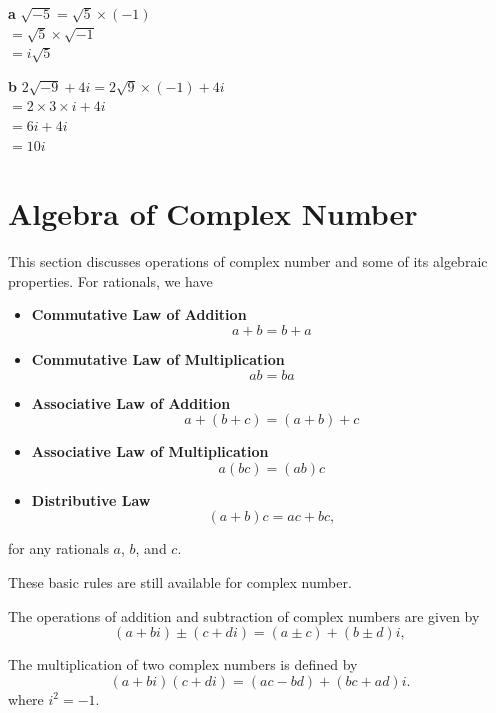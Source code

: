 \documentclass[
	12pt, %
	fleqn, %
	a4paper, %
]{LegrandOrangeBook}
\begin{document}
\textbf{a} \(\sqrt{-5} = \sqrt{5} \times (-1)\) \\
 \(= \sqrt{5} \times \sqrt{-1}\) \\
 \(= i\sqrt{5}\)

\textbf{b} \(2\sqrt{-9} + 4i = 2\sqrt{9} \times (-1) + 4i\) \\
 \(= 2 \times 3 \times i + 4i\) \\
 \(= 6i + 4i\) \\
 \(= 10i\)
\section{Algebra of Complex Number} 
This section discusses operations of complex number and some of its algebraic properties.
For rationals, we have \begin{itemize}
    \item \textbf{Commutative Law of Addition}
    \[ a + b = b + a \]
    
    \item \textbf{Commutative Law of Multiplication}
    \[ ab = ba \]
    
    \item \textbf{Associative Law of Addition}
    \[ a + (b + c) = (a + b) + c \]
    
    \item \textbf{Associative Law of Multiplication}
    \[ a(bc) = (ab)c \]
    
    \item \textbf{Distributive Law}
    \[ (a + b)c = ac + bc, \]
\end{itemize}

for any rationals \( a \), \( b \), and \( c \).

These basic rules are still available for complex number.

\begin{definition}
    The operations of addition and subtraction of complex numbers are given by
\[
(a + bi) \pm (c + di) = (a \pm c) + (b \pm d)i,
\]
\end{definition}

\begin{definition}
    The multiplication of two complex numbers is defined by
\[
(a + bi)(c + di) = (ac - bd) + (bc + ad)i.
\]
where $i^2=-1$.
\end{definition}
\end{document}
